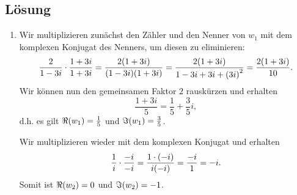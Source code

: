 \documentclass[german,12pt]{homework}
\DeclarePairedDelimiter{\enbrace}{(}{)}
\begin{document}
    \subsection*{Lösung}
    \begin{enumerate}
        \item Wir multiplizieren zunächst den Zähler und den Nenner von \(w_1\) mit dem komplexen Konjugat des Nenners, um diesen zu eliminieren:
        \[\frac{2}{1 - 3i} \cdot \frac{1 + 3i}{1 + 3i} = \frac{2\enbrace*{1 + 3i}}{\enbrace*{1 - 3i}\enbrace*{1 + 3i}} = \frac{2\enbrace*{1 + 3i}}{1 - 3i + 3i + \enbrace*{3i}^2} = \frac{2\enbrace*{1 + 3i}}{10}.\]
        Wir können nun den gemeinsamen Faktor \(2\) rauskürzen und erhalten
        \[\frac{1 + 3i}{5} = \frac{1}{5} + \frac{3}{5}i,\]
        d.h. es gilt \(\Re\enbrace*{w_1} = \frac{1}{5}\) und \(\Im\enbrace*{w_1} = \frac{3}{5}\).

        Wir multiplizieren wieder mit dem komplexen Konjugat und erhalten
        \[\frac{1}{i} \cdot \frac{-i}{-i} = \frac{1 \cdot \enbrace*{-i}}{i\enbrace*{-i}} = \frac{-i}{1} = -i.\]
        Somit ist \(\Re\enbrace*{w_2} = 0\) und \(\Im\enbrace*{w_2} = -1\).


\end{enumerate}
\end{document}
